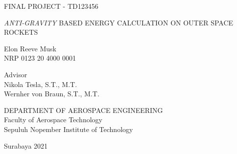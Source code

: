 FINAL PROJECT - TD123456

\vspace{6ex}

\begin{large}
  \emph{ANTI-GRAVITY} BASED ENERGY CALCULATION ON OUTER SPACE ROCKETS
\end{large}

\vspace{4ex}

Elon Reeve Musk \\
NRP 0123 20 4000 0001

\vspace{2ex}

Advisor \\
Nikola Tesla, S.T., M.T. \\
Wernher von Braun, S.T., M.T.

\vspace{6ex}

DEPARTMENT OF AEROSPACE ENGINEERING \\
Faculty of Aerospace Technology \\
Sepuluh Nopember Institute of Technology

Surabaya 2021
